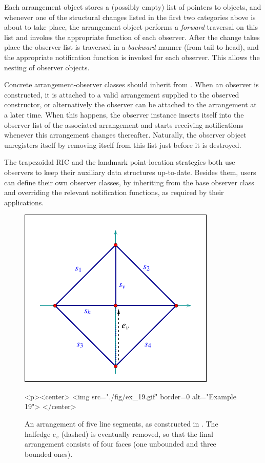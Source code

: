 Each arrangement object stores a (possibly empty) list of pointers to
 objects, and whenever one of the structural
changes listed in the first two categories above is about to take
place, the arrangement object performs a {\em forward} traversal
on this list and invokes the appropriate function of each
observer. After the change takes place the observer list is
traversed in a {\em backward} manner (from tail to head), and the
appropriate notification function is invoked for each observer.
This allows the nesting of observer objects.

Concrete arrangement-observer classes should inherit from
. When an observer is constructed, it is attached to
a valid arrangement supplied to the observed constructor, or alternatively 
the observer can be attached to the arrangement at a later time.
When this happens, the observer instance inserts itself into the
observer list of the associated arrangement and starts receiving
notifications whenever this arrangement changes thereafter. Naturally,
the observer object unregisters itself by removing itself from
this list just before it is destroyed.

The trapezoidal RIC and the landmark point-location strategies
both use observers to keep their auxiliary data structures
up-to-date. Besides them, users can define their own observer
classes, by inheriting from the base observer class and overriding
the relevant notification functions, as required by their
applications.

\begin{figure}[t]
\begin{ccTexOnly}
  \begin{center}
  \includegraphics{Arrangement_2/fig/ex_19}
  \end{center}
\end{ccTexOnly}
\begin{ccHtmlOnly}
  <p><center>
  <img src="./fig/ex_19.gif" border=0 alt="Example 19">
  </center>
\end{ccHtmlOnly}
\caption{An arrangement of five line segments, as constructed in
. The halfedge $e_v$ (dashed) is eventually
removed, so that the final arrangement consists of four faces (one
unbounded and three bounded ones).}
\label{arr_fig:ex_19}
\end{figure}

